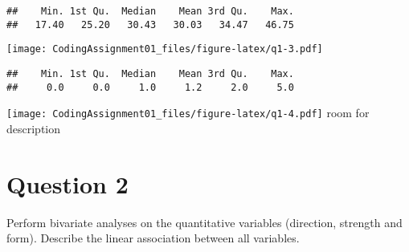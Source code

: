 \documentclass[
]{article}
\newenvironment{Shaded}{\begin{snugshade}}{\end{snugshade}}
\newcommand{\FunctionTok}[1]{\textcolor[rgb]{0.13,0.29,0.53}{\textbf{#1}}}
\newcommand{\NormalTok}[1]{#1}
\newcommand{\SpecialCharTok}[1]{\textcolor[rgb]{0.81,0.36,0.00}{\textbf{#1}}}
\begin{document}
\begin{verbatim}
##    Min. 1st Qu.  Median    Mean 3rd Qu.    Max. 
##   17.40   25.20   30.43   30.03   34.47   46.75
\end{verbatim}

\begin{Shaded}
\end{Shaded}

\texttt{[image: CodingAssignment01\_files/figure-latex/q1-3.pdf]}

\begin{Shaded}
\end{Shaded}

\begin{verbatim}
##    Min. 1st Qu.  Median    Mean 3rd Qu.    Max. 
##     0.0     0.0     1.0     1.2     2.0     5.0
\end{verbatim}

\begin{Shaded}
\end{Shaded}

\texttt{[image: CodingAssignment01\_files/figure-latex/q1-4.pdf]} room
for description

\hypertarget{question-2}{%
\section{Question 2}\label{question-2}}

Perform bivariate analyses on the quantitative variables (direction,
strength and form). Describe the linear association between all
variables.

\begin{Shaded}
\end{Shaded}
\end{document}
